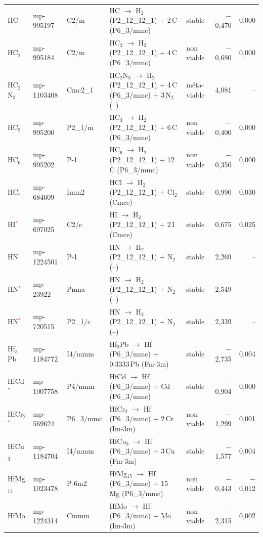 \begin{longtable}{@{}ll l@{\hspace{4pt}} p{4.6cm} l@{\hspace{4pt}} rr@{}}
HC & mp-995197 & C2/m & HC $\to$ H$_{2}$ (P2\_12\_12\_1) $+$ 2\,C (P6\_3/mmc) & stable & $-$0{,}470 & 0{,}000 \\
HC$_{2}$ & mp-995184 & C2/m & HC$_{2}$ $\to$ H$_{2}$ (P2\_12\_12\_1) $+$ 4\,C (P6\_3/mmc) & non viable & $-$0{,}680 & 0{,}000 \\
HC$_{2}$N$_{3}$ & mp-1103408 & Cmc2\_1 & HC$_{2}$N$_{3}$ $\to$ H$_{2}$ (P2\_12\_12\_1) $+$ 4\,C (P6\_3/mmc) $+$ 3\,N$_{2}$ (--) & m\'eta-viable & 4{,}081 & -- \\
HC$_{3}$ & mp-995200 & P2\_1/m & HC$_{3}$ $\to$ H$_{2}$ (P2\_12\_12\_1) $+$ 6\,C (P6\_3/mmc) & non viable & $-$0{,}400 & 0{,}000 \\
HC$_{6}$ & mp-995202 & P-1 & HC$_{6}$ $\to$ H$_{2}$ (P2\_12\_12\_1) $+$ 12\,C (P6\_3/mmc) & non viable & $-$0{,}350 & 0{,}000 \\
HCl & mp-684609 & Imm2 & HCl $\to$ H$_{2}$ (P2\_12\_12\_1) $+$ Cl$_{2}$ (Cmce) & stable & 0{,}990 & 0{,}030 \\
HI\textcolor{red}{$^*$} & mp-697025 & C2/c & HI $\to$ H$_{2}$ (P2\_12\_12\_1) $+$ 2\,I (Cmce) & stable & 0{,}675 & 0{,}025 \\
HN & mp-1224501 & P-1 & HN $\to$ H$_{2}$ (P2\_12\_12\_1) $+$ N$_{2}$ (--) & stable & 2{,}269 & -- \\
HN\textcolor{red}{$^*$} & mp-23922 & Pmna & HN $\to$ H$_{2}$ (P2\_12\_12\_1) $+$ N$_{2}$ (--) & stable & 2{,}549 & -- \\
HN\textcolor{red}{$^*$} & mp-720515 & P2\_1/c & HN $\to$ H$_{2}$ (P2\_12\_12\_1) $+$ N$_{2}$ (--) & stable & 2{,}339 & -- \\
Hf$_{3}$Pb & mp-1184772 & I4/mmm & Hf$_{3}$Pb $\to$ Hf (P6\_3/mmc) $+$ 0.3333\,Pb (Fm-3m) & stable & $-$2{,}735 & 0{,}004 \\
HfCd$^*$ & mp-1007758 & P4/nmm & HfCd $\to$ Hf (P6\_3/mmc) $+$ Cd (P6\_3/mmc) & stable & $-$0{,}904 & 0{,}000 \\
HfCr$_{2}$\textcolor{red}{$^*$} & mp-569624 & P6\_3/mmc & HfCr$_{2}$ $\to$ Hf (P6\_3/mmc) $+$ 2\,Cr (Im-3m) & non viable & $-$1{,}299 & 0{,}001 \\
HfCu$_{3}$ & mp-1184704 & I4/mmm & HfCu$_{3}$ $\to$ Hf (P6\_3/mmc) $+$ 3\,Cu (Fm-3m) & stable & $-$1{,}577 & 0{,}004 \\
HfMg$_{15}$ & mp-1023478 & P-6m2 & HfMg$_{15}$ $\to$ Hf (P6\_3/mmc) $+$ 15\,Mg (P6\_3/mmc) & non viable & $-$0{,}443 & $-$0{,}012 \\
HfMo & mp-1224314 & Cmmm & HfMo $\to$ Hf (P6\_3/mmc) $+$ Mo (Im-3m) & non viable & $-$2{,}315 & 0{,}002 \\

\end{longtable}
